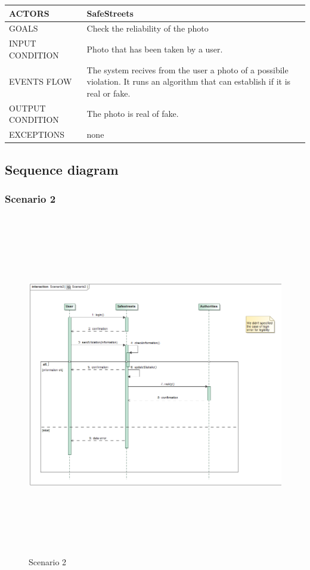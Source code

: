\begin{center}
	\begin{tabular}{ | l | p{6cm} | } 
		\hline
		ACTORS & SafeStreets  \\ 
		\hline
		GOALS & Check the reliability of the photo  \\ 
		\hline
		INPUT CONDITION & Photo that has been taken by a user.  \\ 
		\hline
		EVENTS FLOW & The system recives from the user a photo of a possibile violation. It runs an algorithm that can establish if it is real or fake. \\ 
		\hline
		OUTPUT CONDITION & The photo is real of fake. \\ 
		\hline
		EXCEPTIONS & none \\ 
		\hline
	\end{tabular}
\end{center}


\newpage
\subsection{Sequence diagram}
\subsubsection{Scenario 2}
	\begin{figure}[H]
	\begin{minipage}[b]{0.40\textwidth}
		\includegraphics[width=18cm,height=15cm]{Images/SequenceRASD/Scenario2.png}
		\caption{Scenario 2}
	\end{minipage}
\end{figure}
\newpage
